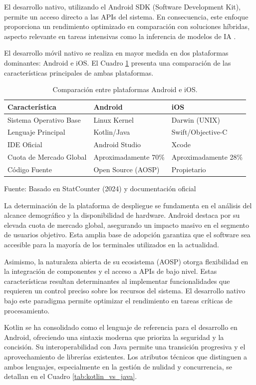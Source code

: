 El desarrollo nativo, utilizando el Android SDK (Software Development Kit), permite un acceso directo a las APIs del sistema. En consecuencia, este enfoque proporciona un rendimiento optimizado en comparación con soluciones híbridas, aspecto relevante en tareas intensivas como la inferencia de modelos de IA \cite{android_programming}.

El desarrollo móvil nativo se realiza en mayor medida en dos plataformas dominantes: Android e iOS. El Cuadro \ref{tab:android_vs_ios} presenta una comparación de las características principales de ambas plataformas.

\begin{table}[H]
\centering
\begin{tabularx}{\linewidth}{p{4cm} p{4cm} p{4cm}}
\toprule
Característica & Android & iOS \\
\midrule
Sistema Operativo Base & Linux Kernel & Darwin (UNIX) \\
Lenguaje Principal & Kotlin/Java & Swift/Objective-C \\
IDE Oficial & Android Studio & Xcode \\
Cuota de Mercado Global & Aproximadamente 70\% & Aproximadamente 28\% \\
Código Fuente & Open Source (AOSP) & Propietario \\
\bottomrule
\end{tabularx}
\caption{Comparación entre plataformas Android e iOS.}\label{tab:android_vs_ios}
Fuente: Basado en StatCounter (2024) \cite{statcounter_mobile} y documentación oficial \cite{android_arch}
\end{table}

La determinación de la plataforma de despliegue se fundamenta en el análisis del alcance demográfico y la disponibilidad de hardware. Android destaca por su elevada cuota de mercado global, asegurando un impacto masivo en el segmento de usuarios objetivo. Esta amplia base de adopción garantiza que el software sea accesible para la mayoría de los terminales utilizados en la actualidad.

Asimismo, la naturaleza abierta de su ecosistema (AOSP) otorga flexibilidad en la integración de componentes y el acceso a APIs de bajo nivel. Estas características resultan determinantes al implementar funcionalidades que requieren un control preciso sobre los recursos del sistema. El desarrollo nativo bajo este paradigma permite optimizar el rendimiento en tareas críticas de procesamiento.

Kotlin se ha consolidado como el lenguaje de referencia para el desarrollo en Android, ofreciendo una sintaxis moderna que prioriza la seguridad y la concisión. Su interoperabilidad con Java permite una transición progresiva y el aprovechamiento de librerías existentes. Los atributos técnicos que distinguen a ambos lenguajes, especialmente en la gestión de nulidad y concurrencia, se detallan en el Cuadro \ref{tab:kotlin_vs_java}.

